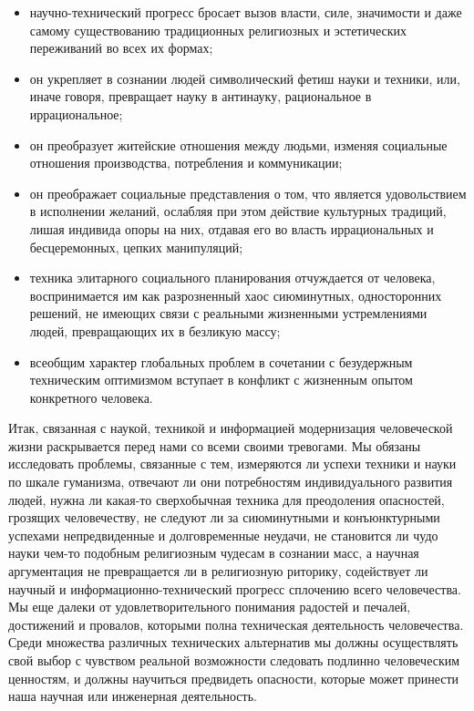 \begin{itemize}
  
\item{научно-технический прогресс бросает вызов власти, силе, значимости и даже самому существованию традиционных религиозных и эстетических переживаний во всех их формах;}
  
\item{он укрепляет в сознании людей символический фетиш науки и техники, или, иначе говоря, превращает науку в антинауку, рациональное в иррациональное;}
  
\item{он преобразует житейские отношения между людьми, изменяя социальные отношения производства, потребления и коммуникации;}
  
\item{он преображает социальные представления о том, что является удовольствием в исполнении желаний, ослабляя при этом действие культурных традиций, лишая индивида опоры на них, отдавая его во власть иррациональных и бесцеремонных, цепких манипуляций;}
  
\item{техника элитарного социального планирования отчуждается от человека, воспринимается им как разрозненный хаос сиюминутных, односторонних решений, не имеющих связи с реальными жизненными устремлениями людей, превращающих их в безликую массу;}
  
\item{всеобщим характер глобальных проблем в сочетании с безудержным техническим оптимизмом вступает в конфликт с жизненным опытом конкретного человека.}
\end{itemize}

Итак, связанная с наукой, техникой и информацией модернизация человеческой жизни раскрывается перед нами со всеми своими тревогами. Мы обязаны исследовать проблемы, связанные с тем, измеряются ли успехи техники и науки по шкале гуманизма, отвечают ли они потребностям индивидуального развития людей, нужна ли какая-то сверхобычная техника для преодоления опасностей, грозящих человечеству, не следуют ли за сиюминутными и конъюнктурными успехами непредвиденные и долговременные неудачи, не становится ли чудо науки чем-то подобным религиозным чудесам в сознании масс, а научная аргументация не превращается ли в религиозную риторику, содействует ли научный и информационно-технический прогресс сплочению всего человечества. Мы еще далеки от удовлетворительного понимания радостей и печалей, достижений и провалов, которыми полна техническая деятельность человечества. Среди множества различных технических альтернатив мы должны осуществлять свой выбор с чувством реальной возможности следовать подлинно человеческим ценностям, и должны научиться предвидеть опасности, которые может принести наша научная или инженерная деятельность.
